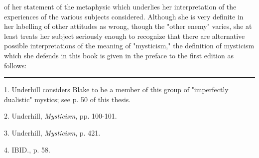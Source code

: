 of her statement of the metaphysic which underlies her interpretation
of the experiences of the various subjects considered.
Although she is very definite in her labelling
of other attitudes as wrong, though the "other enemy" varies,
she at least treats her subject seriously enough to recognize
that there are alternative possible interpretations of the
meaning of "mysticism," the definition of mysticism which
she defends in this book is given in the preface to the
first edition as follows:\par
\vspace*{\fill}
\noindent\rule{0.25\textwidth}{0.4pt}\par
1. Underhill considers Blake to be a member of this group
of "imperfectly dualistic" mystics; see p. 50 of this thesis.\par
2. Underhill, \textit{Mysticism}, pp. 100-101.\par
3. Underhill, \textit{Mysticism}, p. 421.\par
4. IBID., p. 58.\par

\newpage

